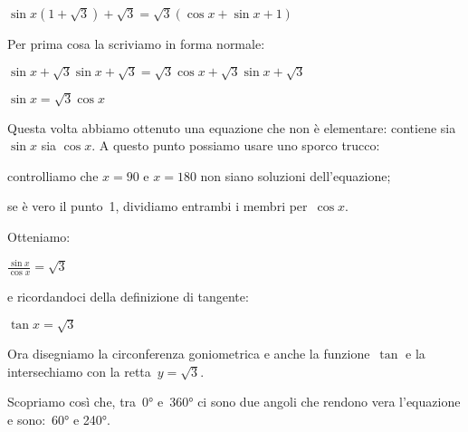  \begin{esempio}
  \(\sin x (1 + \sqrt{3}) + \sqrt{3} = \sqrt{3}(\cos x + \sin x +1)\)
  
  Per prima cosa la scriviamo in forma normale:
  
  \(\sin x + \sqrt{3} \sin x + \sqrt{3} = 
   \sqrt{3} \cos x + \sqrt{3} \sin x + \sqrt{3}\)
   
  \(\sin x  = \sqrt{3} \cos x \)
  
 Questa volta abbiamo ottenuto una equazione che non è elementare: 
  contiene sia \(\sin x\) sia \(\cos x\).
  A questo punto possiamo usare uno sporco trucco:
  
 \begin{minipage}{.50\textwidth}
  \begin{center}
\begin{inaccessibleblock}[Soluzione grafica dell'equazione: 
    \(\tan x = \sqrt{3}\).]
    
\end{inaccessibleblock}
  \end{center}
 \end{minipage}
 \begin{minipage}{.48\textwidth}
  \begin{enumerate*}
   \item controlliamo che \(x = 90\) e \(x = 180\) non siano soluzioni 
    dell'equazione;
   \item se è vero il punto~1, dividiamo entrambi i membri per~\(\cos x\).
  \end{enumerate*}
  Otteniamo:

  \(\frac{\sin x}{\cos x} = \sqrt{3}\)
  
  e ricordandoci della definizione di tangente:

  \(\tan x = \sqrt{3}\)
  
  Ora disegniamo la circonferenza goniometrica e anche la funzione~\(\tan\) 
  e la intersechiamo con la retta~\(y=\sqrt{3}\).
  
  Scopriamo così che, tra~0° e~360° ci sono due angoli che rendono vera 
  l'equazione e sono:~60° e 240°. 
 \end{minipage}
 \end{esempio}


